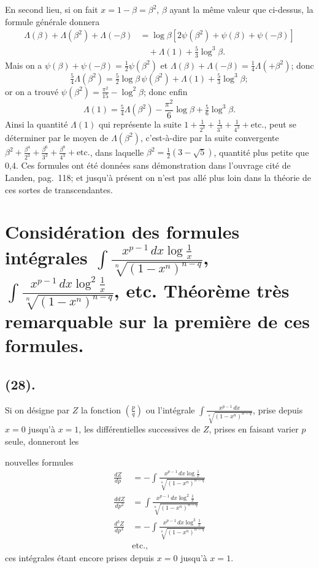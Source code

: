 \documentclass{article}
\begin{document}
En second lieu, si on fait $x=1-\beta=\beta^{2}$, $\beta$ ayant la même valeur que ci-dessus, la formule générale donnera
\[ \begin{aligned} \Lambda(\beta)+\Lambda(\beta^{2})+\Lambda(-\beta)&=\log\beta\left[2\psi(\beta^{2})+\psi(\beta)+\psi(-\beta)\right]\\ &\quad+\Lambda(1)+\tfrac{5}{3}\log^{3}\beta. \end{aligned} \]
Mais on a $\psi(\beta)+\psi(-\beta)=\frac{1}{2}\psi(\beta^{2})$ et $\Lambda(\beta)+\Lambda(-\beta)=\frac{1}{4}\Lambda(+\beta^{2})$; donc
\[ \tfrac{5}{4}\Lambda(\beta^{2})=\tfrac{5}{2}\log\beta\,\psi(\beta^{2})+\Lambda(1)+\tfrac{5}{3}\log^{3}\beta; \]
or on a trouvé $\psi(\beta^{2})=\frac{\pi^{2}}{15}-\log^{2}\beta$; donc enfin
\[ \Lambda(1)=\tfrac{5}{4}\Lambda(\beta^{2})-\frac{\pi^{2}}{6}\log\beta+\tfrac{5}{6}\log^{3}\beta. \]
Ainsi la quantité $\Lambda(1)$ qui représente la suite $1+\frac{1}{2^{3}}+\frac{1}{3^{3}}+\frac{1}{4^{3}}+\text{etc.}$, peut se déterminer par le moyen de $\Lambda(\beta^{2})$, c'est-à-dire par la suite convergente $\beta^{2}+\frac{\beta^{4}}{2^{3}}+\frac{\beta^{6}}{3^{3}}+\frac{\beta^{8}}{4^{3}}+\text{etc.}$, dans laquelle $\beta^{2}=\frac{1}{2}(3-\sqrt{5})$, quantité plus petite que 0,4. Ces formules ont été données sans démonstration dans l'ouvrage cité de Landen, pag.~118; et jusqu'à présent on n'est pas allé plus loin dans la théorie de ces sortes de transcendantes.

\section*{Considération des formules intégrales $\displaystyle\int\frac{x^{p-1}\,dx\log\frac{1}{x}}{\sqrt[n]{(1-x^{n})^{n-q}}}$, $\displaystyle\int\frac{x^{p-1}\,dx\log^{2}\frac{1}{x}}{\sqrt[n]{(1-x^{n})^{n-q}}}$, etc. Théorème très remarquable sur la première de ces formules.}

\subsection*{(28).}

Si on désigne par $Z$ la fonction $\left(\frac{p}{q}\right)$ ou l'intégrale $\displaystyle\int\frac{x^{p-1}\,dx}{\sqrt[n]{(1-x^{n})^{n-q}}}$, prise depuis $x=0$ jusqu'à $x=1$, les différentielles successives de $Z$, prises en faisant varier $p$ seule, donneront les

nouvelles formules
\[ \begin{aligned} \frac{dZ}{dp}&=-\int\frac{x^{p-1}\,dx\log\frac{1}{x}}{\sqrt[n]{(1-x^{n})^{n-q}}}\\ \frac{ddZ}{dp^{2}}&=\int\frac{x^{p-1}\,dx\log^{2}\frac{1}{x}}{\sqrt[n]{(1-x^{n})^{n-q}}}\\ \frac{d^{3}Z}{dp^{3}}&=-\int\frac{x^{p-1}\,dx\log^{3}\frac{1}{x}}{\sqrt[n]{(1-x^{n})^{n-q}}}\\ &\text{etc.}, \end{aligned} \]
ces intégrales étant encore prises depuis $x=0$ jusqu'à $x=1$.
\end{document}
